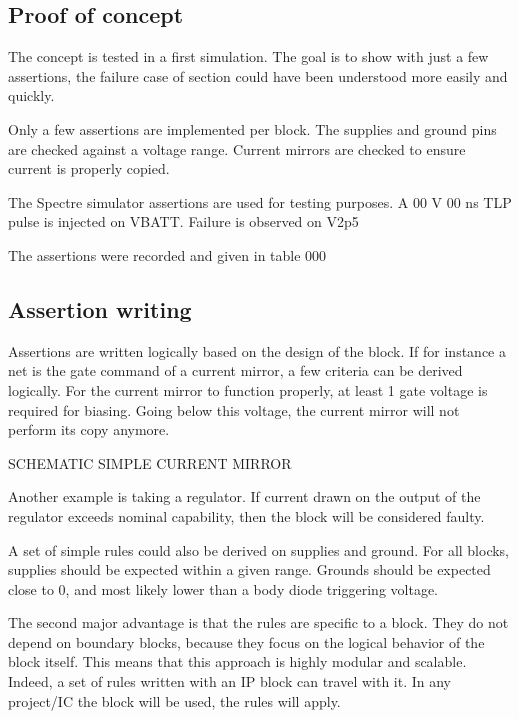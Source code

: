 \subsection{Proof of concept}

The concept is tested in a first simulation.
The goal is to show with just a few assertions, the failure case of section \label{sec:failure-case-study} could have been understood more easily and quickly.

Only a few assertions are implemented per block.
The supplies and ground pins are checked against a voltage range.
Current mirrors are checked to ensure current is properly copied.

The Spectre simulator assertions are used for testing purposes.
A 00 V 00 ns TLP pulse is injected on VBATT.
Failure is observed on V2p5

The assertions were recorded and given in table 000


\subsection{Assertion writing}

Assertions are written logically based on the design of the block.
If for instance a net is the gate command of a current mirror, a few criteria can be derived logically.
For the current mirror to function properly, at least 1 gate voltage is required for biasing.
Going below this voltage, the current mirror will not perform its copy anymore.

SCHEMATIC SIMPLE CURRENT MIRROR

Another example is taking a regulator.
If current drawn on the output of the regulator exceeds nominal capability, then the block will be considered faulty.

A set of simple rules could also be derived on supplies and ground.
For all blocks, supplies should be expected within a given range.
Grounds should be expected close to 0, and most likely lower than a body diode triggering voltage.

The second major advantage is that the rules are specific to a block.
They do not depend on boundary blocks, because they focus on the logical behavior of the block itself.
This means that this approach is highly modular and scalable.
Indeed, a set of rules written with an IP block can travel with it.
In any project/IC the block will be used, the rules will apply.

